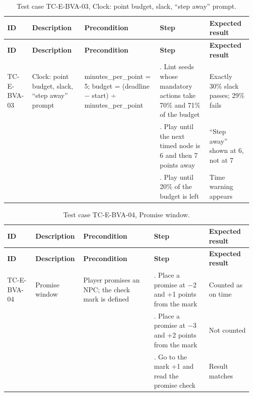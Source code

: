 {\small
\begin{longtable}{|>{\raggedright\arraybackslash}p{}|>{\raggedright\arraybackslash}p{}|>{\raggedright\arraybackslash}p{}|>{\raggedright\arraybackslash}p{}|>{\raggedright\arraybackslash}p{}|}
\caption{Test case TC-E-BVA-03, Clock: point budget, slack, ``step away'' prompt.} \\
\hline
\textbf{ID} & \textbf{Description} & \textbf{Precondition} & \textbf{Step} & \textbf{Expected result} \\ \hline
\endfirsthead
\hline
\textbf{ID} & \textbf{Description} & \textbf{Precondition} & \textbf{Step} & \textbf{Expected result} \\ \hline
\endhead
TC-E-BVA-03 & Clock: point budget, slack, ``step away'' prompt & minutes\_per\_point = 5; budget = (deadline $-$ start) ÷ minutes\_per\_point & 1. Lint seeds whose mandatory actions take 70\% and 71\% of the budget & Exactly 30\% slack passes; 29\% fails \\ \hline
 &  &  & 2. Play until the next timed node is 6 and then 7 points away & ``Step away'' shown at 6, not at 7 \\ \hline
 &  &  & 3. Play until 20\% of the budget is left & Time warning appears \\ \hline
\end{longtable}
}

{\small
\begin{longtable}{|>{\raggedright\arraybackslash}p{}|>{\raggedright\arraybackslash}p{}|>{\raggedright\arraybackslash}p{}|>{\raggedright\arraybackslash}p{}|>{\raggedright\arraybackslash}p{}|}
\caption{Test case TC-E-BVA-04, Promise window.} \\
\hline
\textbf{ID} & \textbf{Description} & \textbf{Precondition} & \textbf{Step} & \textbf{Expected result} \\ \hline
\endfirsthead
\hline
\textbf{ID} & \textbf{Description} & \textbf{Precondition} & \textbf{Step} & \textbf{Expected result} \\ \hline
\endhead
TC-E-BVA-04 & Promise window & Player promises an NPC; the check mark is defined & 1. Place a promise at $-$2 and +1 points from the mark & Counted as on time \\ \hline
 &  &  & 2. Place a promise at $-$3 and +2 points from the mark & Not counted \\ \hline
 &  &  & 3. Go to the mark +1 and read the promise check & Result matches \\ \hline
\end{longtable}
}

